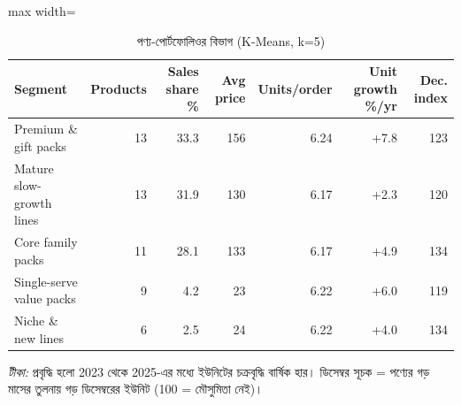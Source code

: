 \begin{table}[htbp]
\centering
\small
\caption{পণ্য-পোর্টফোলিওর বিভাগ (K-Means, k=5)}
\label{tab:productclusters}
\begin{adjustbox}{max width=\linewidth}
\begin{tabular}{lrrrrrr}
\toprule
\textbf{Segment} & \textbf{Products} & \textbf{Sales share \%} & \textbf{Avg price} & \textbf{Units/order} & \textbf{Unit growth \%/yr} & \textbf{Dec. index} \\
\midrule
Premium \& gift packs & 13 & 33.3 & 156 & 6.24 & +7.8 & 123 \\
Mature slow-growth lines & 13 & 31.9 & 130 & 6.17 & +2.3 & 120 \\
Core family packs & 11 & 28.1 & 133 & 6.17 & +4.9 & 134 \\
Single-serve value packs & 9 & 4.2 & 23 & 6.22 & +6.0 & 119 \\
Niche \& new lines & 6 & 2.5 & 24 & 6.22 & +4.0 & 134 \\
\bottomrule
\end{tabular}
\end{adjustbox}
\par\smallskip\parbox{0.92\linewidth}{\footnotesize\emph{টীকা:} প্রবৃদ্ধি হলো 2023 থেকে 2025-এর মধ্যে ইউনিটের চক্রবৃদ্ধি বার্ষিক হার। ডিসেম্বর সূচক = পণ্যের গড় মাসের তুলনায় গড় ডিসেম্বরের ইউনিট (100 = মৌসুমিতা নেই)।}
\end{table}